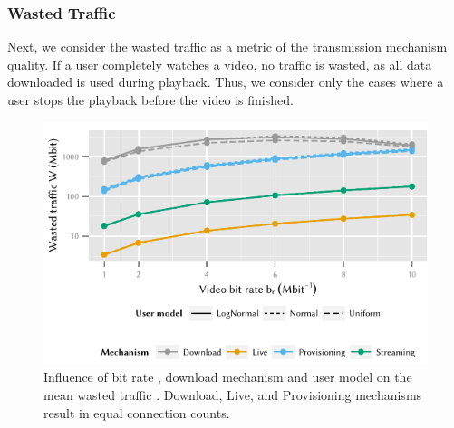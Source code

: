 \subsubsection*{Wasted Traffic}\label{sec:application:lte_video:numerical_evaluation:wasted_traffic}
Next, we consider the wasted traffic \meanwastedtraffic as a metric of the transmission mechanism quality.
If a user completely watches a video, no traffic is wasted, as all data downloaded is used during playback.
Thus, we consider only the cases where a user stops the playback before the video is finished.

\begin{figure}
  \centering
  \includegraphics{application/lte_video/numerical_evaluation/figures/bitrate2lostData}
  \caption{Influence of bit rate \bitrate, download mechanism and user model on the mean wasted traffic \meanwastedtraffic. Download, Live, and Provisioning mechanisms result in equal connection counts.}
  \label{fig:application:lte_video:numerical_evaluation:energy_consumption:bitrate2lostData}
\end{figure}

